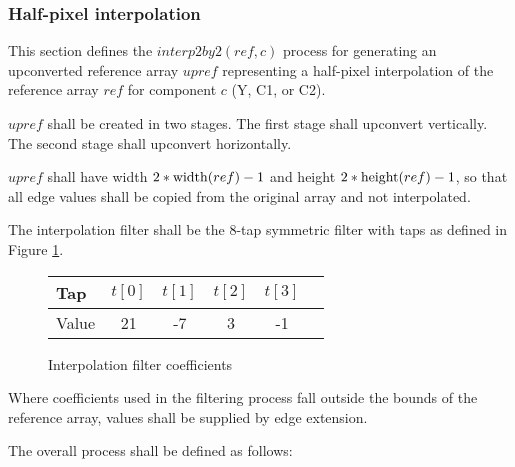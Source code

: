 \subsubsection{Half-pixel interpolation}
\label{halfpel}

This section defines the $interp2by2(ref,c)$ process for generating
an upconverted reference array $upref$ representing a half-pixel interpolation of 
the reference array $ref$ for component $c$ (Y, C1, or C2). 

$upref$ shall be created in two stages. The first stage shall upconvert vertically. The second stage shall upconvert horizontally. 

$upref$ shall have width $2*\operatorname{width}(ref)-1$ and height $2*\operatorname{height}(ref)-1$, so that all
edge values shall be copied from the original array and not interpolated.

The interpolation filter shall be the 8-tap symmetric filter with taps as defined in Figure \ref{upfilter}.

\begin{figure}[h!]
\begin{centering}
\begin{tabular}{l|ccccc}
Tap & $t[0]$ & $t[1]$ & $t[2]$ & $t[3]$\\
\hline
Value & 21 & -7 & 3 & -1
\end{tabular}
\caption{Interpolation filter coefficients \label{upfilter}}
\end{centering}
\end{figure}

Where coefficients used in the filtering process fall outside the bounds of the 
reference array, values shall be supplied by edge extension. 

The overall process shall be defined as follows:

